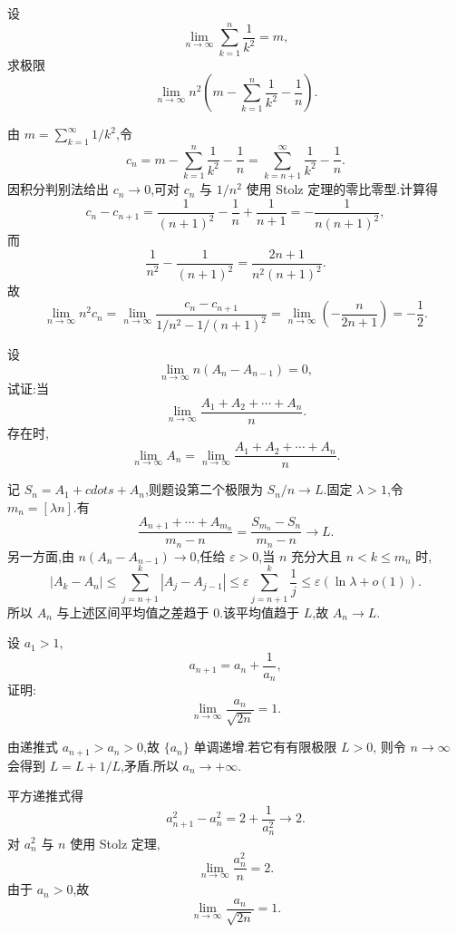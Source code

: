 \begin{example}
  设
  \[
    \lim\limits_{n\to\infty}\sum\limits_{k=1}^n\dfrac{1}{k^2}=m,
  \]
  求极限
  \[
    \lim\limits_{n\to\infty}
    n^2\left(m-\sum\limits_{k=1}^n\dfrac{1}{k^2}-\dfrac{1}{n}\right).
  \]
\end{example}
\exampleblank

\begin{solution}
  由 $m=\displaystyle \sum\limits_{k=1}^{\infty}1/k^2$,令
  \[
    c_n=m-\sum\limits_{k=1}^n\dfrac{1}{k^2}-\dfrac{1}{n}
    =\sum\limits_{k=n+1}^{\infty}\dfrac{1}{k^2}-\dfrac{1}{n}.
  \]
  因积分判别法给出 $c_n\to0$,可对 $c_n$ 与 $1/n^2$ 使用 Stolz 定理的零比零型.计算得
  \[
    c_n-c_{n+1}
    =\dfrac{1}{(n+1)^2}-\dfrac{1}{n}+\dfrac{1}{n+1}
    =-\dfrac{1}{n(n+1)^2},
  \]
  而
  \[
    \dfrac{1}{n^2}-\dfrac{1}{(n+1)^2}
    =\dfrac{2n+1}{n^2(n+1)^2}.
  \]
  故
  \[
    \lim\limits_{n\to\infty}n^2c_n
    =\lim\limits_{n\to\infty}
    \dfrac{c_n-c_{n+1}}{1/n^2-1/(n+1)^2}
    =\lim\limits_{n\to\infty}\left(-\dfrac{n}{2n+1}\right)
    =-\dfrac{1}{2}.
  \]
\end{solution}

\begin{example}
  设
  \[
    \lim\limits_{n\to\infty}n(A_n-A_{n-1})=0,
  \]
  试证:当
  \[
    \lim\limits_{n\to\infty}\dfrac{A_1+A_2+\cdots+A_n}{n}.
  \]
  存在时,
  \[
    \lim\limits_{n\to\infty}A_n
    =
    \lim\limits_{n\to\infty}\dfrac{A_1+A_2+\cdots+A_n}{n}.
  \]
\end{example}
\exampleblank

\begin{solution}
  记 $S_n=A_1+cdots+A_n$,则题设第二个极限为 $S_n/n\to L$.固定
  $\lambda>1$,令 $m_n=[\lambda n]$.有
  \[
    \dfrac{A_{n+1}+\cdots+A_{m_n}}{m_n-n}
    =\dfrac{S_{m_n}-S_n}{m_n-n}\longrightarrow L.
  \]
  另一方面,由 $n(A_n-A_{n-1})\to0$,任给 $\varepsilon>0$,当 $n$ 充分大且
  $n<k\leq m_n$ 时,
  \[
    |A_k-A_n|
    \leq\sum\limits_{j=n+1}^k|A_j-A_{j-1}|
    \leq\varepsilon\sum\limits_{j=n+1}^k\dfrac{1}{j}
    \leq\varepsilon(\ln\lambda+o(1)).
  \]
  所以 $A_n$ 与上述区间平均值之差趋于 $0$.该平均值趋于 $L$,故 $A_n\to L$.
\end{solution}

\begin{example}
  设 $a_1>1$,
  \[
    a_{n+1}=a_n+\dfrac{1}{a_n},
  \]
  证明:
  \[
    \lim\limits_{n\to\infty}\dfrac{a_n}{\sqrt{2n}}=1.
  \]
\end{example}
\exampleblank

\begin{solution}
  由递推式 $a_{n+1}>a_n>0$,故 $\{a_n\}$ 单调递增.若它有有限极限 $L>0$,
  则令 $n\to\infty$ 会得到 $L=L+1/L$,矛盾.所以 $a_n\to+\infty$.

  平方递推式得
  \[
    a_{n+1}^2-a_n^2=2+\dfrac{1}{a_n^2}\longrightarrow2.
  \]
  对 $a_n^2$ 与 $n$ 使用 Stolz 定理,
  \[
    \lim\limits_{n\to\infty}\dfrac{a_n^2}{n}=2.
  \]
  由于 $a_n>0$,故
  \[
    \lim\limits_{n\to\infty}\dfrac{a_n}{\sqrt{2n}}=1.
  \]
\end{solution}

